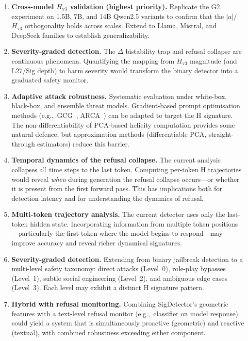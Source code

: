 \documentclass[12pt,a4paper]{article}
\begin{document}
\begin{enumerate}[leftmargin=*]
    \item \textbf{Cross-model $H_{\text{v3}}$ validation (highest priority).} Replicate the G2 experiment on 1.5B, 7B, and 14B Qwen2.5 variants to confirm that the $|a|$/$H_{\text{v3}}$ orthogonality holds across scales. Extend to Llama, Mistral, and DeepSeek families to establish generalizability.
    \item \textbf{Severity-graded detection.} The $\Delta$ bistability trap and refusal collapse are continuous phenomena. Quantifying the mapping from $H_{\text{v3}}$ magnitude (and L27/Sig depth) to harm severity would transform the binary detector into a graduated safety monitor.
    \item \textbf{Adaptive attack robustness.} Systematic evaluation under white-box, black-box, and ensemble threat models. Gradient-based prompt optimisation methods (e.g.,~GCG~\cite{gcg2023}, ARCA~\cite{arca2024}) can be adapted to target the H signature. The non-differentiability of PCA-based helicity computation provides some natural defence, but approximation methods (differentiable PCA, straight-through estimators) reduce this barrier.
    \item \textbf{Temporal dynamics of the refusal collapse.} The current analysis collapses all time steps to the last token. Computing per-token H trajectories would reveal \textit{when} during generation the refusal collapse occurs---or whether it is present from the first forward pass. This has implications both for detection latency and for understanding the dynamics of refusal.
    \item \textbf{Multi-token trajectory analysis.} The current detector uses only the last-token hidden state. Incorporating information from multiple token positions---particularly the first token where the model begins to respond---may improve accuracy and reveal richer dynamical signatures.
    \item \textbf{Severity-graded detection.} Extending from binary jailbreak detection to a multi-level safety taxonomy: direct attacks (Level~0), role-play bypasses (Level~1), subtle social engineering (Level~2), and ambiguous edge cases (Level~3). Each level may exhibit a distinct H signature pattern.
    \item \textbf{Hybrid with refusal monitoring.} Combining SigDetector's geometric features with a text-level refusal monitor (e.g.,~classifier on model response) could yield a system that is simultaneously proactive (geometric) and reactive (textual), with combined robustness exceeding either component.
\end{enumerate}
\end{document}
